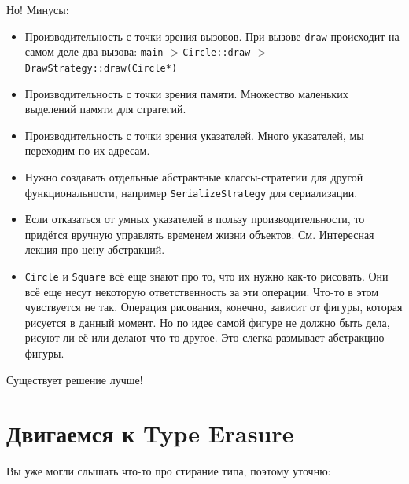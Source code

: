 \documentclass[14pt,a4paper]{article}
\providecommand{\tightlist}{%
	\setlength{\itemsep}{0pt}\setlength{\parskip}{0pt}}
\begin{document}
Но! Минусы:

\begin{itemize}
\tightlist
\item
  Производительность с точки зрения вызовов. При вызове \texttt{draw}
  происходит на самом деле два вызова: \texttt{main} -\textgreater{}
  \texttt{Circle::draw} -\textgreater{}
  \texttt{DrawStrategy::draw(Circle*)}
\item
  Производительность с точки зрения памяти. Множество маленьких
  выделений памяти для стратегий.
\item
  Производительность с точки зрения указателей. Много указателей, мы
  переходим по их адресам.
\item
  Нужно создавать отдельные абстрактные классы-стратегии для другой
  функциональности, например \texttt{SerializeStrategy} для
  сериализации.
\item
  Если отказаться от умных указателей в пользу производительности, то
  придётся вручную управлять временем жизни объектов. См.
  \href{https://youtu.be/rHIkrotSwcc}{Интересная лекция про цену
  абстракций}.
\item
  \texttt{Circle} и \texttt{Square} всё еще знают про то, что их нужно
  как-то рисовать. Они всё еще несут некоторую ответственность за эти
  операции. Что-то в этом чувствуется не так. Операция рисования,
  конечно, зависит от фигуры, которая рисуется в данный момент. Но по
  идее самой фигуре не должно быть дела, рисуют ли её или делают что-то
  другое. Это слегка размывает абстракцию фигуры.
\end{itemize}

Существует решение лучше!

\hypertarget{ux434ux432ux438ux433ux430ux435ux43cux441ux44f-ux43a-type-erasure}{%
\section{Двигаемся к Type
Erasure}\label{ux434ux432ux438ux433ux430ux435ux43cux441ux44f-ux43a-type-erasure}}

Вы уже могли слышать что-то про стирание типа, поэтому уточню:
\end{document}
